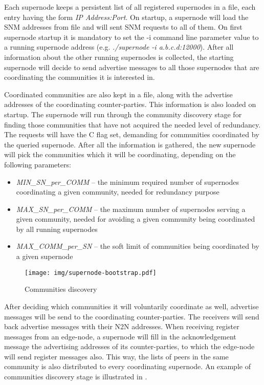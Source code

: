 Each supernode keeps a persistent list of all registered supernodes in a file, each entry having the form \emph{IP Address:Port}. On startup, a supernode will load the SNM addresses from file and will sent SNM requests to all of them. On first supernode startup it is mandatory to set the -i command line parameter value to a running supernode address (e.g. \emph{./supernode -i a.b.c.d:12000}). After all information about the other running supernodes is collected, the starting supernode will decide to send advertise messages to all those supernodes that are coordinating the communities it is interested in.

Coordinated communities are also kept in a file, along with the advertise addresses of the coordinating counter-parties. This information is also loaded on startup. The supernode will  run through the community discovery stage for finding those communities that have not acquired the needed level of redundancy. The requests will have the C flag set, demanding for communities coordinated by the queried supernode. After all the information is gathered, the new supernode will pick the communities which it will be coordinating, depending on the following parameters: 
\begin{itemize}
\item \emph{MIN_SN_per_COMM} – the minimum required number of supernodes coordinating a given community, needed for redundancy purpose 
\item \emph{MAX_SN_per_COMM} – the maximum number of supernodes serving a given community, needed for avoiding a given community being coordinated by all running supernodes 
\item \emph{MAX_COMM_per_SN} – the soft limit of communities being coordinated by a given supernode
\end{itemize}

\begin{figure}[hbtp]
\begin{center}
\texttt{[image: img/supernode-bootstrap.pdf]}
\caption{Communities discovery \label{img:supernode-bootstrap}}
\end{center}
\end{figure}

After deciding which communities it will voluntarily coordinate as well, advertise messages will be send to the coordinating counter-parties. The receivers will send back advertise messages with their N2N addresses. When receiving register messages from an edge-node, a supernode will fill in the acknowledgement message the advertising addresses of its counter-parties, to which the edge-node will send register messages also. This way, the lists of peers in the same community is also distributed to every coordinating supernode. An example of communities discovery stage is illustrated in .